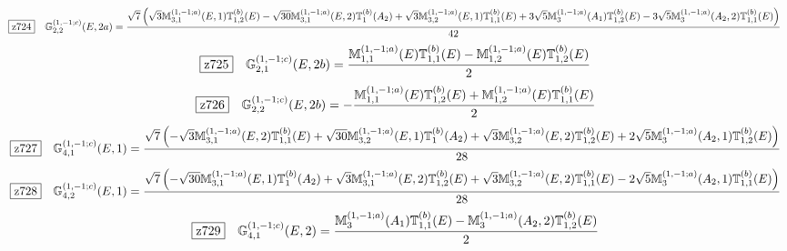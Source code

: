 \documentclass[fleqn,10pt,landscape]{jsarticle}
\begin{document}
\begin{dmath*}
\hspace*{3mm}\fbox{z724}\quad \mathbb{G}_{2,2}^{(1,-1;c)}(E,2a)=\frac{\sqrt{7} \left(\sqrt{3} \mathbb{M}_{3,1}^{(1,-1;a)}(E,1) \mathbb{T}_{1,2}^{(b)}(E) - \sqrt{30} \mathbb{M}_{3,1}^{(1,-1;a)}(E,2) \mathbb{T}_{1}^{(b)}(A_{2}) + \sqrt{3} \mathbb{M}_{3,2}^{(1,-1;a)}(E,1) \mathbb{T}_{1,1}^{(b)}(E) + 3 \sqrt{5} \mathbb{M}_{3}^{(1,-1;a)}(A_{1}) \mathbb{T}_{1,2}^{(b)}(E) - 3 \sqrt{5} \mathbb{M}_{3}^{(1,-1;a)}(A_{2},2) \mathbb{T}_{1,1}^{(b)}(E)\right)}{42}
\end{dmath*}
\begin{dmath*}
\hspace*{3mm}\fbox{z725}\quad \mathbb{G}_{2,1}^{(1,-1;c)}(E,2b)=\frac{\mathbb{M}_{1,1}^{(1,-1;a)}(E) \mathbb{T}_{1,1}^{(b)}(E) - \mathbb{M}_{1,2}^{(1,-1;a)}(E) \mathbb{T}_{1,2}^{(b)}(E)}{2}
\end{dmath*}
\begin{dmath*}
\hspace*{3mm}\fbox{z726}\quad \mathbb{G}_{2,2}^{(1,-1;c)}(E,2b)=- \frac{\mathbb{M}_{1,1}^{(1,-1;a)}(E) \mathbb{T}_{1,2}^{(b)}(E) + \mathbb{M}_{1,2}^{(1,-1;a)}(E) \mathbb{T}_{1,1}^{(b)}(E)}{2}
\end{dmath*}
\begin{dmath*}
\hspace*{3mm}\fbox{z727}\quad \mathbb{G}_{4,1}^{(1,-1;c)}(E,1)=\frac{\sqrt{7} \left(- \sqrt{3} \mathbb{M}_{3,1}^{(1,-1;a)}(E,2) \mathbb{T}_{1,1}^{(b)}(E) + \sqrt{30} \mathbb{M}_{3,2}^{(1,-1;a)}(E,1) \mathbb{T}_{1}^{(b)}(A_{2}) + \sqrt{3} \mathbb{M}_{3,2}^{(1,-1;a)}(E,2) \mathbb{T}_{1,2}^{(b)}(E) + 2 \sqrt{5} \mathbb{M}_{3}^{(1,-1;a)}(A_{2},1) \mathbb{T}_{1,2}^{(b)}(E)\right)}{28}
\end{dmath*}
\begin{dmath*}
\hspace*{3mm}\fbox{z728}\quad \mathbb{G}_{4,2}^{(1,-1;c)}(E,1)=\frac{\sqrt{7} \left(- \sqrt{30} \mathbb{M}_{3,1}^{(1,-1;a)}(E,1) \mathbb{T}_{1}^{(b)}(A_{2}) + \sqrt{3} \mathbb{M}_{3,1}^{(1,-1;a)}(E,2) \mathbb{T}_{1,2}^{(b)}(E) + \sqrt{3} \mathbb{M}_{3,2}^{(1,-1;a)}(E,2) \mathbb{T}_{1,1}^{(b)}(E) - 2 \sqrt{5} \mathbb{M}_{3}^{(1,-1;a)}(A_{2},1) \mathbb{T}_{1,1}^{(b)}(E)\right)}{28}
\end{dmath*}
\begin{dmath*}
\hspace*{3mm}\fbox{z729}\quad \mathbb{G}_{4,1}^{(1,-1;c)}(E,2)=\frac{\mathbb{M}_{3}^{(1,-1;a)}(A_{1}) \mathbb{T}_{1,1}^{(b)}(E) - \mathbb{M}_{3}^{(1,-1;a)}(A_{2},2) \mathbb{T}_{1,2}^{(b)}(E)}{2}
\end{dmath*}
\end{document}
